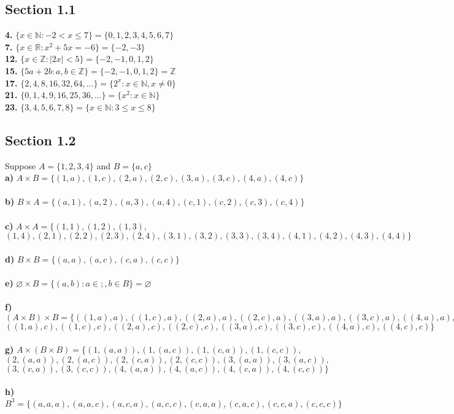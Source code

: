 \documentclass[12pt]{article}
\newcommand{\N}{\mathbb{N}}
\newcommand{\Z}{\mathbb{Z}}
\newcommand{\R}{\mathbb{R}}
\let\emptyset\varnothing
\begin{document}
\subsection*{Section 1.1}
\textbf{4.} $\{ x \in \N: -2 < x \leq 7 \} = \{ 0,1,2,3,4,5,6,7 \}$\\
\textbf{7.} $\{ x \in \R: x^2 + 5x = -6 \} = \{ -2,-3 \}$\\
\textbf{12.} $\{ x \in \Z: |2x| < 5 \} = \{ -2,-1,0,1,2 \}$\\
\textbf{15.} $\{ 5a + 2b: a,b \in \Z \} = \{ -2,-1,0,1,2 \} = \Z$\\
\textbf{17.} $\{ 2,4,8,16,32,64,... \} = \{ 2^x: x \in \N, x \neq 0 \}$\\
\textbf{21.} $\{ 0,1,4,9,16,25,36,... \} = \{ x^2: x \in \N \}$\\
\textbf{23.} $\{ 3,4,5,6,7,8 \} = \{ x\in \N : 3 \leq x \leq 8 \}$
\subsection*{Section 1.2}
Suppose $A = \{ 1,2,3,4 \}$ and $B = \{ a,c \}$\\
\textbf{a)} $A\times B = \{(1,a),(1, c),(2,a),(2, c),(3,a),(3, c),(4,a),(4, c)\}$\\\\
\textbf{b)} $B \times A = \{(a,1),(a,2),(a,3),(a,4),(c,1),(c,2),(c,3),(c,4)\}$\\\\
\textbf{c)} $A \times A = \{ (1,1),(1,2),(1,3),$\\$(1,4),(2,1),(2,2),(2,3),(2,4),
(3,1),(3,2),(3,3),(3,4),(4,1),(4,2),(4,3),(4,4) \}$\\\\
\textbf{d)} $B \times B = \{ (a,a),(a, c),(c,a),(c, c) \}$\\\\
\textbf{e)} $\emptyset \times B = \{ (a,b) : a ∈ ;,b ∈ B \} = \emptyset$\\\\
\textbf{f)} $(A \times B) \times B = \{ ((1,a),a),((1, c),a),((2,a),a),((2, c),a),((3,a),a),((3, c),a),((4,a),a),((4, c),a),$\\$
((1,a), c),((1, c), c),((2,a), c),((2, c), c),((3,a), c),((3, c), c),((4,a), c),((4, c), c) \}$\\\\
\textbf{g)} $A \times (B \times B) = \{ (1,(a,a)),(1,(a, c)),(1,(c,a)),(1,(c, c)),$\\$
(2,(a,a)),(2,(a, c)),(2,(c,a)),(2,(c, c)),
(3,(a,a)),(3,(a, c)),$\\$(3,(c,a)),(3,(c, c)),
(4,(a,a)),(4,(a, c)),(4,(c,a)),(4,(c, c)) \}$\\\\
\textbf{h)} $B^3 = \{ (a,a,a),(a,a, c),(a, c,a),(a, c, c),(c,a,a),(c,a, c),(c, c,a),(c, c, c) \}$
\end{document}
